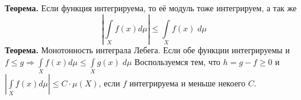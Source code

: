 \textbf{Теорема.} Если функция интегрируема, то её модуль тоже интегрируем, а так же 
\[|\int\limits_{X}  f(x)  d \mu| \leq   \int\limits_{X}  f  (x)\; d \mu\]
\textbf{Теорема.} Монотонность интеграла Лебега. Если обе функции интегрируемы и $f \leq g  \Rightarrow \int\limits_{X}  f(x)  d \mu \leq   \int\limits_{X} g (x)\; d \mu $
\Proof
Воспользуемся тем, что  $h = g - f \geq 0$ и $|\int\limits_{X}  f(x)  d \mu| \leq  C\cdot \mu(X)$, если $f$ интегрируема и меньше некоего $C$.\EndProof
























